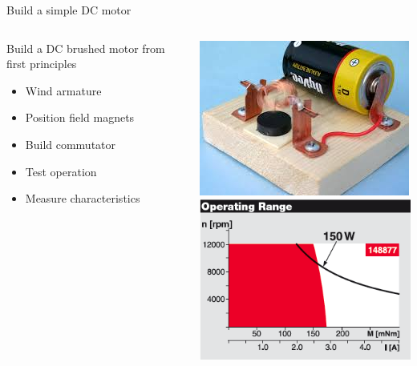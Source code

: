 \documentclass[compress]{beamer}
\begin{document}
\begin{frame}{Build a simple DC motor}
    \begin{columns}
        \begin{column}{0.45\linewidth}
            Build a DC brushed motor from first principles
            \begin{itemize}

                \item Wind armature

                \item Position field magnets

                \item Build commutator

                \item Test operation

                \item Measure characteristics

            \end{itemize}

        \end{column}
        \begin{column}{0.45\linewidth}

            \begin{center}
                \includegraphics[width=0.8\columnwidth]{simple-dc-motor}\\
                \includegraphics[width=0.8\columnwidth]{motor-characterisation}
            \end{center}

        \end{column}
    \end{columns}
\end{frame}
\end{document}
